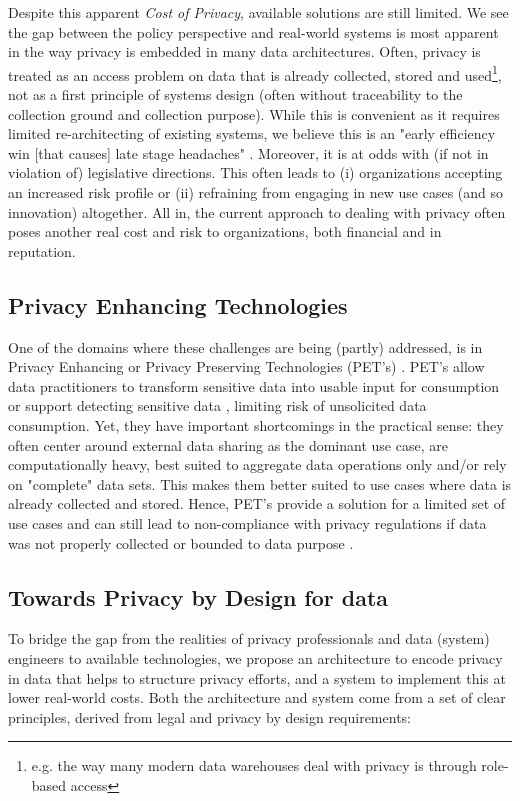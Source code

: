 \documentclass[11pt]{article} %
\begin{document}
Despite this apparent \textit{Cost of Privacy}, available solutions are still limited. We see the gap between the policy perspective and real-world systems is most apparent in the way privacy is embedded in many data architectures. Often, privacy is treated as an access problem on data that is already collected, stored and used\footnote{e.g. the way many modern data warehouses deal with privacy is through role-based access}, not as a first principle of systems design (often without traceability to the collection ground and collection purpose). While this is convenient as it requires limited re-architecting of existing systems, we believe this is an "early efficiency win [that causes] late stage headaches" \cite{bhajaria2022data}. Moreover, it is at odds with (if not in violation of) legislative directions. This often leads to (i) organizations accepting an increased risk profile or (ii) refraining from engaging in new use cases (and so innovation) altogether. All in, the current approach to dealing with privacy often poses another real cost and risk to organizations, both financial and in reputation. 

\subsection{Privacy Enhancing Technologies}
One of the domains where these challenges are being (partly) addressed, is in Privacy Enhancing or Privacy Preserving Technologies (PET's) \cite{Polonetsky2021review}. PET's allow data practitioners to transform sensitive data into usable input for consumption or support detecting sensitive data \cite{bhajaria2022data}, limiting risk of unsolicited data consumption. Yet, they have important shortcomings in the practical sense: they often center around external data sharing as the dominant use case, are computationally heavy, best suited to aggregate data operations only and/or rely on "complete" data sets. This makes them better suited to use cases where data is already collected and stored. Hence, PET's provide a solution for a limited set of use cases and can still lead to non-compliance with privacy regulations if data was not properly collected or bounded to data purpose \cite{bhajaria2022data}.

\subsection{Towards Privacy by Design for data}
To bridge the gap from the realities of privacy professionals and data (system) engineers to available technologies, we propose an architecture to encode privacy in data that helps to structure privacy efforts, and a system to implement this at lower real-world costs. Both the architecture and system come from a set of clear principles, derived from legal and privacy by design requirements:
\end{document}
